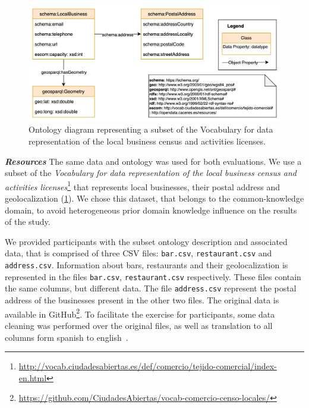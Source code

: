 \begin{figure}[!t]
\centering
\includegraphics[width=0.85\linewidth]{figures/mapeathor_us_onto.png}
\caption[Ontology diagram for the user study exercise of Mapeathor]{Ontology diagram representing a subset of the Vocabulary for data representation of the local business census and activities licenses.}
\label{fig:chp5_us_onto}
\end{figure}

\noindent\textit{\textbf{Resources}}
The same data and ontology was used for both evaluations. We use a subset of the \textit{Vocabulary for data representation of the local business census and activities licenses}\footnote{\url{http://vocab.ciudadesabiertas.es/def/comercio/tejido-comercial/index-en.html}} that represents local businesses, their postal address and geolocalization (\cref{fig:chp5_us_onto}). 
We chose this dataset, that belongs to the common-knowledge domain, to avoid heterogeneous prior domain knowledge influence on the results of the study.

We provided participants with the subset ontology description and associated data, that is comprised of three CSV files: \texttt{bar.csv}, \texttt{restaurant.csv} and \texttt{address.csv}. Information about bars, restaurants and their geolocalization is represented in the files \texttt{bar.csv}, \texttt{restaurant.csv} respectively. 
These files contain the same columns, but different data. The file \texttt{address.csv} represent the postal address of the businesses present in the other two files. 
The original data is available in GitHub\footnote{\url{https://github.com/CiudadesAbiertas/vocab-comercio-censo-locales/}}. 
To facilitate the exercise for participants, some data cleaning was performed over the original files, as well as translation to all columns form spanish to english~\citep{iglesias-molina_2022_8154522}.



